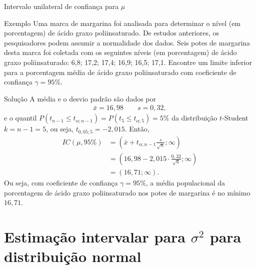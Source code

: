 \documentclass[8pt]{beamer}
\begin{document}
\begin{frame}{Intervalo unilateral de confiança para $\mu$}

\small
	
	\begin{block}{Exemplo}
		Uma marca de margarina foi analisada para determinar o nível (em porcentagem) de ácido graxo poliinsaturado. De estudos anteriores, os pesquisadores podem assumir a normalidade dos dados. Seis potes de margarina desta marca foi coletada com os seguintes níveis (em porcentagem) de ácido graxo poliinsaturado: 6,8; 17,2; 17,4; 16,9; 16,5; 17,1. Encontre um limite inferior para a porcentagem média de ácido graxo poliinsaturado com coeficiente de confiança $\gamma=95\%$.
	\end{block}

	\begin{block}{Solução}
		A média e o desvio padrão são dados por
		\begin{align*}
			\bar{x} = 16,98 \qquad s = 0,32,
		\end{align*}
		e o quantil $P(t_{n-1} \leq t_{\alpha; n-1}) = P(t_5 \leq t_{\alpha;5}) = 5\%$ da distribuição $t$-Student $k=n-1=5$, ou seja, $t_{0,05; 5}=-2,015$. Então,
		\begin{align*}
			IC(\mu, 95\%) &= \left(\bar{x} + t_{\alpha; n-1} \frac{s}{\sqrt{n}}; \infty\right)\\
			&= \left(16,98 - 2,015 \cdot \frac{0,32}{\sqrt{6}}; \infty\right)\\
			&= (16,71; \infty).
		\end{align*}
		Ou seja, com coeficiente de confiança $\gamma=95\%$, a média populacional da porcentagem de ácido graxo poliinsaturado nos potes de margarina é no mínimo $16,71$.
		
	\end{block}

\normalsize

\end{frame}

\section{Estimação intervalar para $\sigma^2$ para distribuição normal}

\large
\end{document}
